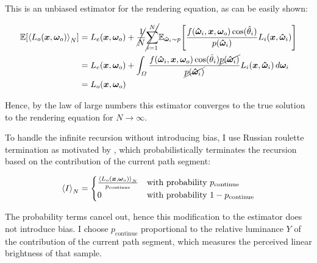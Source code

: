 This is an unbiased estimator for the rendering equation, as can be easily shown:

\begin{equation}
\begin{aligned}
    \expectation{\estimator{L_o(\vec{x}, \wo)}}
    &= L_e(\vec{x}, \wo) + \cancel{\frac{1}{N}} \cancel{\sum_{i=1}^{N}} \expectationvar{\vec{\hat{\omega}}_i \sim p}{\frac{f(\vec{\hat{\omega}}_i, \vec{x}, \wo) \cos(\hat{\theta}_i)}{p(\vec{\hat{\omega}}_i)} L_i(\vec{x}, \vec{\hat{\omega}}_i)} \\
    &= L_e(\vec{x}, \wo) + \int_{\Omega} \frac{f(\vec{\hat{\omega}}_i, \vec{x}, \wo) \cos(\hat{\theta}_i) \cancel{p(\vec{\hat{\omega}}_i)}}{\cancel{p(\vec{\hat{\omega}}_i)}} L_i(\vec{x}, \vec{\hat{\omega}}_i) \diff\wi \\
    &= L_o(\vec{x}, \wo)
\end{aligned}
\end{equation}

Hence, by the law of large numbers this estimator converges to the true solution to the rendering equation for $N \to \infty$.

To handle the infinite recursion without introducing bias, I use Russian roulette termination as motivated by \textcite{veach1997}, which probabilistically terminates the recursion based on the contribution of the current path segment:

\begin{equation}
    \estimator{I} =
    \begin{cases}
        \frac{\estimator{L_o(\vec{x}, \wo)}}{p_\mathrm{continue}} & \text{with probability } p_\mathrm{continue} \\
        0 & \text{with probability } 1 - p_\mathrm{continue}
    \end{cases}
\end{equation}

The probability terms cancel out, hence this modification to the estimator does not introduce bias.
I choose $p_\mathrm{continue}$ proportional to the relative luminance $Y$  of the contribution of the current path segment, which measures the perceived linear brightness of that sample.



